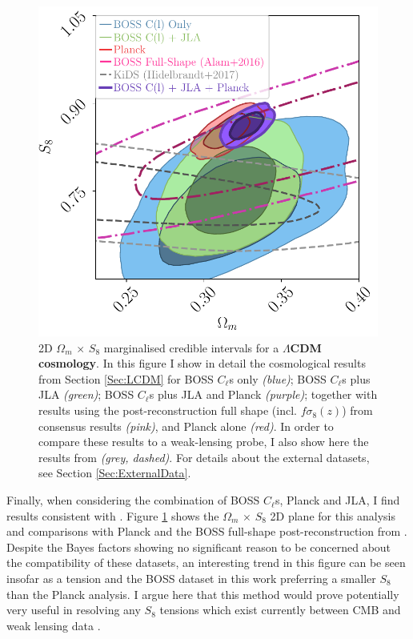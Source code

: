 \begin{figure}
\begin{center}
\includegraphics[scale=0.70]{BOSS-FIGS/LCDM_External_KidsOmega_m.pdf}
\caption[2D $\Omega_m \, \times \, S_8$ marginalised credible intervals for a $\Lambda$CDM cosmology.]{2D $\Omega_m \, \times \, S_8$ marginalised credible intervals for a \textbf{$\Lambda$CDM cosmology}. In this figure I show in detail the cosmological results from Section \ref{Sec:LCDM} for BOSS $C_{\ell}$s only \textit{(blue)}; BOSS $C_{\ell}$s plus JLA \textit{(green)}; BOSS $C_{\ell}$s plus JLA and Planck \textit{(purple)}; together with results using the post-reconstruction full shape (incl. $f\sigma_8(z)$) from \protect\cite{2016BOSSCosmology} consensus results \textit{(pink)}, and Planck alone \textit{(red)}. In order to compare these results to a weak-lensing probe, I also show here the results from \protect\cite{2017MNRAS.465.1454H} \textit{(grey, dashed)}. For details about the external datasets, see Section \ref{Sec:ExternalData}.}
\label{fig:Om_S8_LCDM}
\end{center}
\end{figure}

\qquad Finally, when considering the combination of BOSS $C_{\ell}$s, Planck and JLA, I find results consistent with \cite{2016BOSSCosmology,2017MNRAS.465.1454H,2017arXiv170801530D}. Figure \ref{fig:Om_S8_LCDM} shows the $\Omega_m \, \times \, S_8 $ 2D plane for this analysis and comparisons with Planck and the BOSS full-shape post-reconstruction from \cite{2016BOSSCosmology}. Despite the Bayes factors showing no significant reason to be concerned about the compatibility of these datasets, an interesting trend in this figure can be seen insofar as a tension and the BOSS dataset in this work preferring a smaller $S_8$ than the Planck analysis. I argue here that this method would prove potentially very useful in resolving any $S_8$ tensions which exist currently between CMB and weak lensing data \citep{2015MacCrann,2017CharnockTension}.

